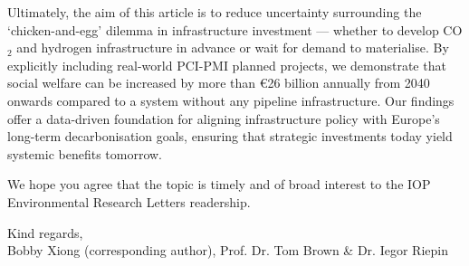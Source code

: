 \documentclass[10pt,a4paper,roman]{moderncv}        %
\begin{document}
Ultimately, the aim of this article is to reduce uncertainty surrounding the `chicken-and-egg' dilemma in infrastructure investment --- whether to develop CO$_2$ and hydrogen infrastructure in advance or wait for demand to materialise. By explicitly including real-world PCI-PMI planned projects, we demonstrate that social welfare can be increased by more than €26 billion annually from 2040 onwards compared to a system without any pipeline infrastructure. Our findings offer a data-driven foundation for aligning infrastructure policy with Europe's long-term decarbonisation goals, ensuring that strategic investments today yield systemic benefits tomorrow.

We hope you agree that the topic is timely and of broad interest to the IOP Environmental Research Letters readership.

Kind regards,\\
Bobby Xiong (corresponding author), Prof. Dr. Tom Brown \& Dr. Iegor Riepin

\newpage


\end{document}
